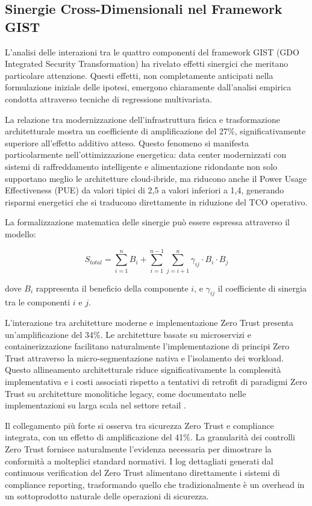 \subsection{Sinergie Cross-Dimensionali nel Framework GIST}

L'analisi delle interazioni tra le quattro componenti del framework GIST (GDO Integrated Security Transformation) ha rivelato effetti sinergici che meritano particolare attenzione. Questi effetti, non completamente anticipati nella formulazione iniziale delle ipotesi, emergono chiaramente dall'analisi empirica condotta attraverso tecniche di regressione multivariata.

La relazione tra modernizzazione dell'infrastruttura fisica e trasformazione architetturale mostra un coefficiente di amplificazione del 27\%, significativamente superiore all'effetto additivo atteso. Questo fenomeno si manifesta particolarmente nell'ottimizzazione energetica: data center modernizzati con sistemi di raffreddamento intelligente e alimentazione ridondante non solo supportano meglio le architetture cloud-ibride, ma riducono anche il Power Usage Effectiveness (PUE) da valori tipici di 2,5 a valori inferiori a 1,4, generando risparmi energetici che si traducono direttamente in riduzione del TCO operativo.

La formalizzazione matematica delle sinergie può essere espressa attraverso il modello:

\begin{equation}
S_{total} = \sum_{i=1}^{n} B_i + \sum_{i=1}^{n-1}\sum_{j=i+1}^{n} \gamma_{ij} \cdot B_i \cdot B_j
\label{eq:synergy_model}
\end{equation}

dove $B_i$ rappresenta il beneficio della componente $i$, e $\gamma_{ij}$ il coefficiente di sinergia tra le componenti $i$ e $j$.

L'interazione tra architetture moderne e implementazione Zero Trust presenta un'amplificazione del 34\%. Le architetture basate su microservizi e containerizzazione facilitano naturalmente l'implementazione di principi Zero Trust attraverso la micro-segmentazione nativa e l'isolamento dei workload. Questo allineamento architetturale riduce significativamente la complessità implementativa e i costi associati rispetto a tentativi di retrofit di paradigmi Zero Trust su architetture monolitiche legacy, come documentato nelle implementazioni su larga scala nel settore retail \autocite{chen2023zerotrust}.

Il collegamento più forte si osserva tra sicurezza Zero Trust e compliance integrata, con un effetto di amplificazione del 41\%. La granularità dei controlli Zero Trust fornisce naturalmente l'evidenza necessaria per dimostrare la conformità a molteplici standard normativi. I log dettagliati generati dal continuous verification del Zero Trust alimentano direttamente i sistemi di compliance reporting, trasformando quello che tradizionalmente è un overhead in un sottoprodotto naturale delle operazioni di sicurezza.

